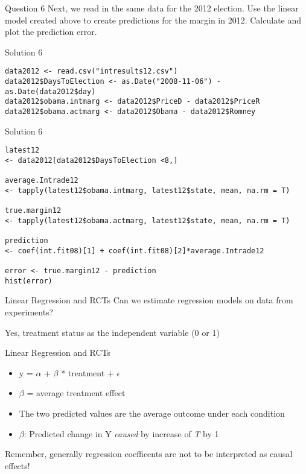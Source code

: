 \documentclass[presentation]{beamer}
\begin{document}
\begin{frame}[label={sec:org31ed5c1}]{Question 6}
Next, we read in the same data for the 2012 election. Use the linear model created above to create predictions for the margin in 2012. Calculate and plot the prediction error.
\end{frame}

\begin{frame}[fragile,shrink=25,label={sec:orgeb35354}]{Solution 6}
 \begin{verbatim}
data2012 <- read.csv("intresults12.csv")
data2012$DaysToElection <- as.Date("2008-11-06") - as.Date(data2012$day)
data2012$obama.intmarg <- data2012$PriceD - data2012$PriceR
data2012$obama.actmarg <- data2012$Obama - data2012$Romney
\end{verbatim}
\end{frame}


\begin{frame}[fragile,shrink=25,label={sec:orgdec5fa5}]{Solution 6}
 \begin{verbatim}
latest12
<- data2012[data2012$DaysToElection <8,]

average.Intrade12
<- tapply(latest12$obama.intmarg, latest12$state, mean, na.rm = T)

true.margin12
<- tapply(latest12$obama.actmarg, latest12$state, mean, na.rm = T)

prediction
<- coef(int.fit08)[1] + coef(int.fit08)[2]*average.Intrade12

error <- true.margin12 - prediction
hist(error)
\end{verbatim}
\end{frame}


\begin{frame}[label={sec:org2ea4750}]{Linear Regression and RCTs}
Can we estimate regression models on data from experiments?

\pause

\alert{Yes, treatment status as the independent variable (0 or 1)}
\end{frame}


\begin{frame}[label={sec:orgc05ffde}]{Linear Regression and RCTs}
\begin{itemize}
\item y = \(\alpha\) + \(\beta\) * treatment + \(\epsilon\)

\item \(\beta\) = average treatment effect

\item The two predicted values are the average outcome under each condition
\end{itemize}

\pause

\begin{itemize}
\item \(\beta\): Predicted change in Y \emph{caused} by increase of \emph{T} by 1
\end{itemize}

\pause

\alert{Remember, generally regression coefficents are not to be interpreted as causal effects!}
\end{frame}
\end{document}
